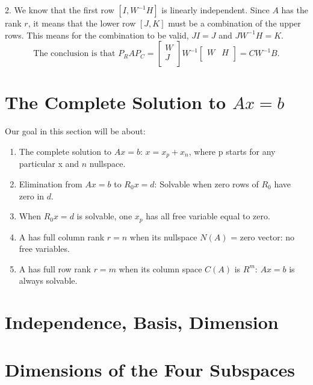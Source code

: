 2. We know that the first row \([I, W^{-1}H]\) is linearly independent. Since \(A\) has the rank \(r\), it means that the lower row \([J, K]\) must be a combination of the upper rows. This means for the combination to be valid, \(JI = J\) and \(JW^{-1}H = K\). 
\[
    \text{The conclusion is that }
    P_{R}AP_{C} = 
    \begin{bmatrix}
         W \\
         J \\
    \end{bmatrix}
    W^{-1}
    \begin{bmatrix}
        W & H  \\
    \end{bmatrix}
    = CW^{-1}B.
\] 

\section{The Complete Solution to \(Ax = b\)}

Our goal in this section will be about: 
\begin{enumerate}
    \item The complete solution to \(Ax = b\): \(x = x_p + x_n\), where p starts for any particular x and \(n\) nullspace. 
    \item Elimination from \(Ax = b\) to \(R_{0}x = d\): Solvable when zero rows of \(R_0\) have zero in \(d\).   
    \item When \(R_{0}x = d\) is solvable, one \(x_p\) has all free variable equal to zero. 
    \item A has full column rank \(r = n\) when its nullspace \(N(A)\) = zero vector: no free variables. 
    \item A has full row rank \(r = m\) when its column space \(C(A)\) is \(R^m\): \(Ax = b\) is always solvable.         
\end{enumerate}


\section{Independence, Basis, Dimension}

\section{Dimensions of the Four Subspaces}


